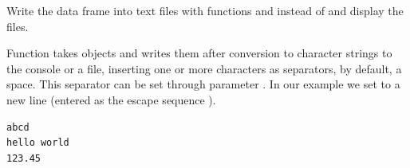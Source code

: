 \documentclass[krantz2]{krantz}\usepackage{knitr}
\begin{document}
\begin{playground}
Write the data frame  into text files with functions  and  instead of  and display the files.
\end{playground}

Function  takes \Rlang objects and writes them after conversion to character strings to the console or a file, inserting one or more characters as separators, by default, a space. This separator can be set through parameter . In our example we set  to a new line (entered as the escape sequence ).

\begin{knitrout}\footnotesize
{}\color{fgcolor}\begin{kframe}
\begin{alltt}
 \hlkwb{<-} \hlstd{(}\hlstd{,} \hlstd{,} \hlstd{)}
  \hlstd{=} \hlstd{,}  \hlstd{=} \hlstd{)}
\hlstd{(}\hlstd{,}  \hlstd{=} \hlstd{)}
\end{alltt}
\end{kframe}
\end{knitrout}

\begin{knitrout}\footnotesize
{}\color{fgcolor}\begin{kframe}
\begin{verbatim}
abcd
hello world
123.45
\end{verbatim}
\end{kframe}
\end{knitrout}

\subsection[readr]{}\label{sec:files:readr}
\end{document}
